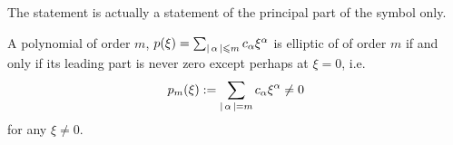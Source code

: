 \documentclass{article}
\begin{document}
The statement is actually a statement of the principal part of the symbol only. 
\begin{lemma}
    A polynomial of order $m$, $p(\xi) = \sum_{\left|\, \alpha\,\right| \leqslant m} c_\alpha \xi^\alpha$ is elliptic of of order $m$ if and only if its leading part is never zero except perhaps at $\xi = 0$, i.e. 
    \begin{align*}
    p_m(\xi) := \sum_{\left|\, \alpha\,\right| = m} c_\alpha \xi^\alpha \neq 0 
    \end{align*}
    for any $\xi \neq 0$. 
\end{lemma}
\end{document}
